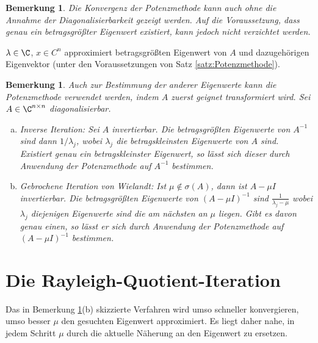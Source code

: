 \documentclass[
]{mycourse}
\theoremstyle{mythm}
\newtheorem{bemerkung}[theorem]{Bemerkung}
\theoremstyle{break}
\newcommand{\norm}[1]{\left\Vert#1\right\Vert}		%
\begin{document}
\begin{bemerkung}
Die Konvergenz der Potenzmethode kann auch ohne die Annahme der Diagonalisierbarkeit gezeigt werden. Auf die Voraussetzung, 
dass genau ein \emph{betragsgrößter} Eigenwert existiert, kann jedoch nicht verzichtet werden.
\end{bemerkung}

\begin{alg}
\label{algo:Potenzmethode}
\begin{algorithmic}
\Repeat
{}
\State{$x:=\tilde x / \norm{\tilde x}$}
\State \Return $\lambda\in \C$, $x\in C^n$ approximiert betragsgrößten Eigenwert von $A$ und dazugehörigen Eigenvektor (unter den Voraussetzungen von Satz 
\ref{satz:Potenzmethode}).
\end{algorithmic}
\end{alg}


\begin{bemerkung}\label{bem:PM_andereEW}
Auch zur Bestimmung der anderer Eigenwerte kann die Potenzmethode verwendet werden, indem $A$ zuerst geignet transformiert wird.
Sei $A\in \C^{n\times n}$ diagonalisierbar.
\begin{enumerate}[(a)]
\item \emph{Inverse Iteration:} Sei $A$ invertierbar. Die betragsgrößten Eigenwerte von $A^{-1}$ sind dann  $1/\lambda_j$, wobei 
$\lambda_j$ die betragskleinsten Eigenwerte von $A$ sind. Existiert genau ein betragskleinster Eigenwert, so lässt sich dieser durch Anwendung der Potenzmethode auf $A^{-1}$ bestimmen. 
%
\item \emph{Gebrochene Iteration von Wielandt}: Ist $\mu\not\in \sigma(A)$, dann ist $A-\mu I$ invertierbar.
Die betragsgrößten Eigenwerte von $(A-\mu I)^{-1}$ sind $\frac{1}{\lambda_j-\mu}$ wobei $\lambda_j$ diejenigen Eigenwerte sind die
am nächsten an $\mu$ liegen. Gibt es davon genau einen, so lässt er sich durch Anwendung der Potenzmethode auf $(A-\mu I)^{-1}$ bestimmen.
\end{enumerate}
\end{bemerkung}

\section{Die Rayleigh-Quotient-Iteration}\label{sect:RQ}
Das in Bemerkung \ref{bem:PM_andereEW}(b) skizzierte Verfahren wird umso schneller konvergieren, umso besser $\mu$ den gesuchten Eigenwert 
approximiert. Es liegt daher nahe, in jedem Schritt $\mu$ durch die aktuelle Näherung an den Eigenwert zu ersetzen. 
\end{document}
